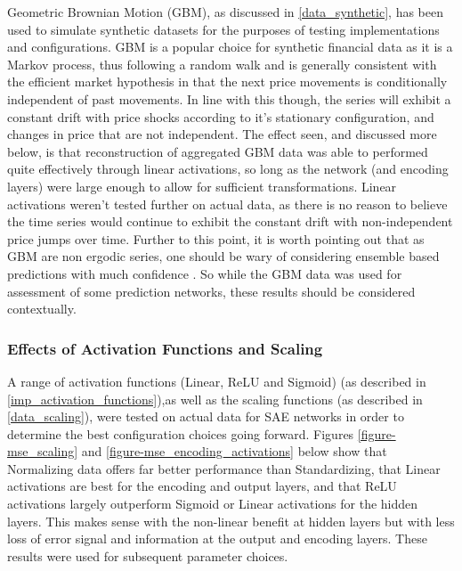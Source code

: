 \documentclass[a4paper,11pt,oneside]{article}
\theoremstyle{plain}
\theoremstyle{definition}
\begin{document}
	Geometric Brownian Motion (GBM), as discussed in \ref{data_synthetic}, has been used to simulate synthetic datasets for the purposes of testing implementations and configurations. GBM is a popular choice for synthetic financial data as it is a Markov process, thus following a random walk and is generally consistent with the efficient market hypothesis in that the next price movements is conditionally independent of past movements. In line with this though, the series will exhibit a constant drift with price shocks according to it's stationary configuration, and changes in price that are not independent. The effect seen, and discussed more below, is that reconstruction of aggregated GBM data was able to performed quite effectively through linear activations, so long as the network (and encoding layers) were large enough to allow for sufficient transformations. Linear activations weren't tested further on actual data, as there is no reason to believe the time series would continue to exhibit the constant drift with non-independent price jumps over time. Further to this point, it is worth pointing out that as GBM are non ergodic series, one should be wary of considering ensemble based predictions with much confidence \cite{Peters}. So while the GBM data was used for assessment of some prediction networks, these results should be considered contextually.
	
	\subsubsection{Effects of Activation Functions and Scaling}\label{results_activations_scaling}
	
	A range of activation functions (Linear, ReLU and Sigmoid) (as described in \ref{imp_activation_functions}),as well as the scaling functions (as described in \ref{data_scaling}), were tested on actual data for SAE networks in order to determine the best configuration choices going forward. Figures \ref{figure-mse_scaling} and \ref{figure-mse_encoding_activations} below show that Normalizing data offers far better performance than Standardizing, that Linear activations are best for the encoding and output layers, and that ReLU activations largely outperform Sigmoid or Linear activations for the hidden layers. This makes sense with the non-linear benefit at hidden layers but with less loss of error signal and information at the output and encoding layers. These results were used for subsequent parameter choices.
	
\end{document}
